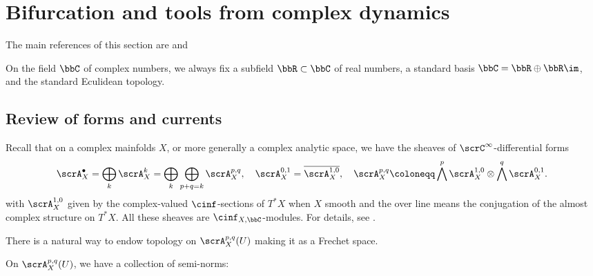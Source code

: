 \section{Bifurcation and tools from complex dynamics}

The main references of this section are \cite{DeMarco-2003-DynamicsRationalMaps,DeMarco-2018-DynamicalModuliSpaces} and \Yang{}

On the field $\bbC$ of complex numbers, we always fix a subfield $\bbR\subset \bbC$ of real numbers, a standard basis $\bbC = \bbR \oplus \bbR \im$, and the standard Eculidean topology.
\Yang{}



\subsection[status=draft,tag=0000000,label=\labelNFM{subsec:forms-and-currents}]{Review of forms and currents}

Recall that on a complex mainfolds $X$, or more generally a complex analytic space, we have the sheaves of $\scrC^\infty$-differential forms
\[ \scrA_X^\bullet = \bigoplus_{k} \scrA_X^k = \bigoplus_{k} \bigoplus_{p+q = k} \scrA_X^{p,q}, \quad \scrA_X^{0,1} = \overline{\scrA_{X}^{1,0}}, \quad \scrA_X^{p,q} \coloneqq \bigwedge^p \scrA_X^{1,0} \otimes \bigwedge^q \scrA_X^{0,1}. \]
with $\scrA_X^{1,0}$ given by the complex-valued $\cinf$-sections of $T^*X$ when $X$ smooth and the over line means the conjugation of the almost complex structure on $T^*X$.
All these sheaves are $\cinf_{X,\bbC}$-modules.
For details, see \cite{Demailly-2012-ComplexAnalyticDifferential,Barlet-Magnusson-2019-ComplexAnalyticCycles}.

There is a natural way to endow topology on $\scrA_X^{p,q}(U)$ making it as a Frechet space.

\begin{construction}[label=\labelNFM{constr:topo-on-forms}, status=draft, tag=0000000]
	On $\scrA_X^{p,q}(U)$, we have a collection of semi-norms:
	\Yang{}
\end{construction}


\Yang{}

